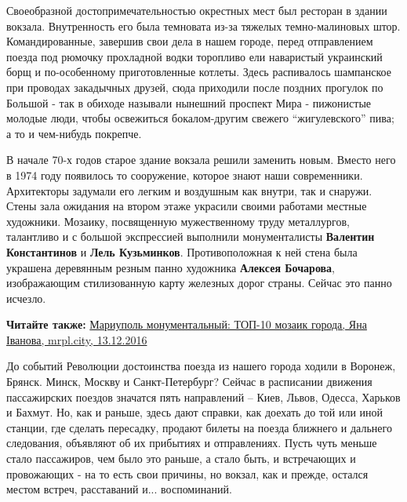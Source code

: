 Своеобразной достопримечательностью окрестных мест был ресторан в здании
вокзала. Внутренность его была темновата из-за тяжелых темно-малиновых штор.
Командированные, завершив свои дела в нашем городе, перед отправлением поезда
под рюмочку прохладной водки торопливо ели наваристый украинский борщ и
по-особенному приготовленные котлеты. Здесь распивалось шампанское при проводах
закадычных друзей, сюда приходили после поздних прогулок по Большой - так в
обиходе называли нынешний проспект Мира - пижонистые молодые люди, чтобы
освежиться бокалом-другим свежего \enquote{жигулевского} пива; а то и чем-нибудь
покрепче.

В начале 70-х годов старое здание вокзала решили заменить новым. Вместо него в
1974 году появилось то сооружение, которое знают наши современники. Архитекторы
задумали его легким и воздушным как внутри, так и снаружи. Стены зала ожидания
на втором этаже украсили своими работами местные художники. Мозаику,
посвященную мужественному труду металлургов, талантливо и с большой экспрессией
выполнили монументалисты \textbf{Валентин Константинов} и \textbf{Лель Кузьминков}.
Противоположная к ней стена была украшена деревянным резным панно художника
\textbf{Алексея Бочарова}, изображающим стилизованную карту железных дорог страны.
Сейчас это панно исчезло.

\textbf{Читайте также:} \href{https://mrpl.city/news/view/mariupol-monumentalnyj-top-10-mozaik-goroda-foto}{%
Мариуполь монументальный: ТОП-10 мозаик города, Яна Іванова, mrpl.city, 13.12.2016}

До событий Революции достоинства поезда из нашего города ходили в Воронеж,
Брянск. Минск, Москву и Санкт-Петербург? Сейчас в расписании движения
пассажирских поездов значатся пять направлений – Киев, Львов, Одесса, Харьков и
Бахмут. Но, как и раньше, здесь дают справки, как доехать до той или иной
станции, где сделать пересадку, продают билеты на поезда ближнего и дальнего
следования, объявляют об их прибытиях и отправлениях. Пусть чуть меньше стало
пассажиров, чем было это раньше, а стало быть, и встречающих и провожающих - на
то есть свои причины, но вокзал, как и прежде, остался местом встреч,
расставаний и... воспоминаний.

